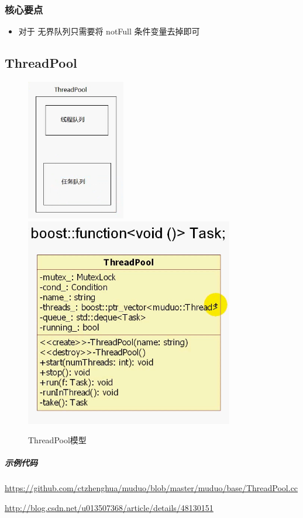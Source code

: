 \documentclass[UTF8,a4paper,8pt]{ctexbook}
\begin{document}
			\subsubsection{核心要点}
				\begin{itemize}
					\item 对于 无界队列只需要将 notFull 条件变量去掉即可
				\end{itemize}
		\subsection{ThreadPool}
				\begin{figure}[htbp]
					\centering
					\includegraphics[scale= 0.7]{figure/ThreadPool.png}
					\includegraphics[scale= 0.5]{figure/muduoThreadPool.png}
					\caption{ThreadPool模型}
				\end{figure}
			
			\subparagraph{示例代码}\url{https://github.com/ctzhenghua/muduo/blob/master/muduo/base/ThreadPool.cc}
			
			\url{http://blog.csdn.net/u013507368/article/details/48130151}
		
\end{document}
